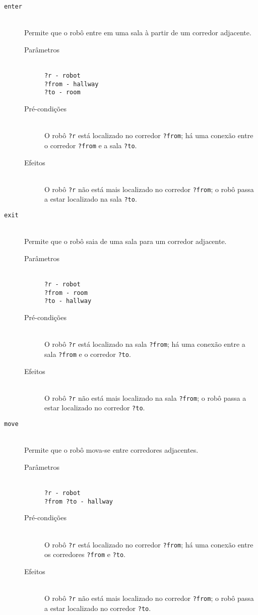 \documentclass[letterpaper]{article}
\begin{document}
\begin{description}
\item[\texttt{enter}] \hfill\\
  Permite que o robô entre em uma sala à partir de um corredor adjacente.
    \begin{description}
      \item[Parâmetros] \hfill\\
        \texttt{?r - robot\\?from - hallway\\?to - room}
      \item[Pré-condições] \hfill\\
        O robô \texttt{?r} está localizado no corredor \texttt{?from}; há uma conexão entre o corredor \texttt{?from} e a sala \texttt{?to}.
      \item[Efeitos] \hfill\\
        O robô \texttt{?r} não está mais localizado no corredor \texttt{?from}; o robô passa a estar localizado na sala \texttt{?to}.
    \end{description}

\item[\texttt{exit}] \hfill\\
  Permite que o robô saia de uma sala para um corredor adjacente.
    \begin{description}
      \item[Parâmetros] \hfill\\
        \texttt{?r - robot\\?from - room\\?to - hallway}
      \item[Pré-condições] \hfill\\
        O robô \texttt{?r} está localizado na sala \texttt{?from}; há uma conexão entre a sala \texttt{?from} e o corredor \texttt{?to}.
      \item[Efeitos] \hfill\\
        O robô \texttt{?r} não está mais localizado na sala \texttt{?from}; o robô passa a estar localizado no corredor \texttt{?to}.
    \end{description}

\item[\texttt{move}] \hfill\\
  Permite que o robô mova-se entre corredores adjacentes.
    \begin{description}
      \item[Parâmetros] \hfill\\
        \texttt{?r - robot\\?from ?to - hallway}
      \item[Pré-condições] \hfill\\
        O robô \texttt{?r} está localizado no corredor \texttt{?from}; há uma conexão entre os corredores \texttt{?from} e \texttt{?to}.
      \item[Efeitos] \hfill\\
        O robô \texttt{?r} não está mais localizado no corredor \texttt{?from}; o robô passa a estar localizado no corredor \texttt{?to}.
    \end{description}


\end{description}
\end{document}
